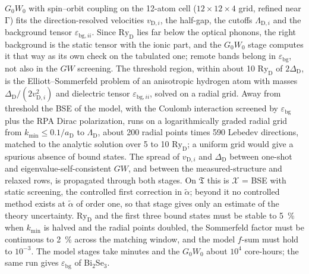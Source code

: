 $G_0W_0$ with spin--orbit coupling on the 12-atom cell ($12\times12\times4$ grid, refined near $\mathrm{\Gamma}$) fits the direction-resolved velocities $v_{\mathrm{D},i}$, the half-gap, the cutoffs $\Lambda_{\mathrm{D},i}$ and the background tensor $\varepsilon_{\mathrm{bg},ii}$. Since $\mathrm{Ry}_{\mathrm{D}}$ lies far below the optical phonons, the right background is the static tensor with the ionic part, and the $G_0W_0$ stage computes it that way as its own check on the tabulated one; remote bands belong in $\varepsilon_{\mathrm{bg}}$, not also in the $GW$ screening. The threshold region, within about 10 $\mathrm{Ry}_{\mathrm{D}}$ of $2\Delta_{\mathrm{D}}$, is the Elliott--Sommerfeld problem of an anisotropic hydrogen atom with masses $\Delta_{\mathrm{D}}/(2v_{\mathrm{D},i}^2)$ and dielectric tensor $\varepsilon_{\mathrm{bg},ii}$, solved on a radial grid. Away from threshold the BSE of the model, with the Coulomb interaction screened by $\varepsilon_{\mathrm{bg}}$ plus the RPA Dirac polarization, runs on a logarithmically graded radial grid from $k_{\mathrm{min}} \le 0.1/a_{\mathrm{D}}$ to $\Lambda_{\mathrm{D}}$, about 200 radial points times 590 Lebedev directions, matched to the analytic solution over 5 to 10 $\mathrm{Ry}_{\mathrm{D}}$; a uniform grid would give a spurious absence of bound states. The spread of $v_{\mathrm{D},i}$ and $\Delta_{\mathrm{D}}$ between one-shot and eigenvalue-self-consistent $GW$, and between the measured-structure and relaxed rows, is propagated through both stages. On $\mathfrak{T}$ this is $\mathcal{X}$ = BSE with static screening, the controlled first correction in $\tilde\alpha$; beyond it no controlled method exists at $\tilde\alpha$ of order one, so that stage gives only an estimate of the theory uncertainty. $\mathrm{Ry}_{\mathrm{D}}$ and the first three bound states must be stable to \SI{5}{\percent} when $k_{\mathrm{min}}$ is halved and the radial points doubled, the Sommerfeld factor must be continuous to \SI{2}{\percent} across the matching window, and the model $f$-sum must hold to $10^{-3}$. The model stages take minutes and the $G_0W_0$ about $10^4$ core-hours; the same run gives $\varepsilon_{\mathrm{bg}}$ of Bi$_2$Se$_3$.

